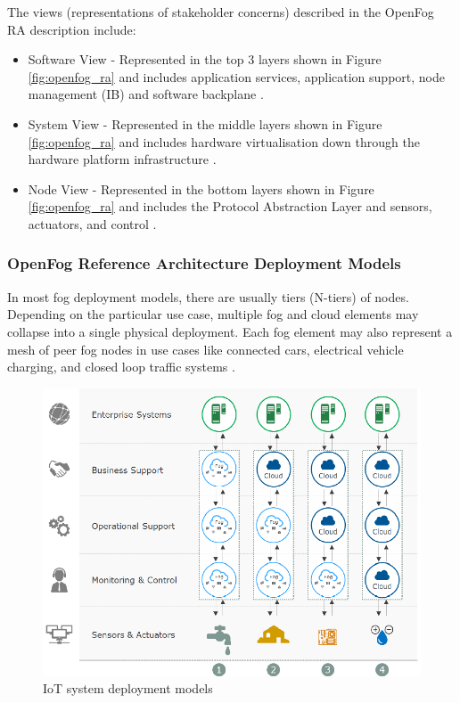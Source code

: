 \documentclass{article}
\begin{document}
The views (representations of stakeholder concerns) \cite{openfogconsortium2017} described in the OpenFog RA description include:

\begin{itemize}
\item Software View - Represented in the top 3 layers shown in Figure \ref{fig:openfog_ra} and includes application services, application support, node management (IB) and software backplane \cite{openfogconsortium2017}.

\item System View - Represented in the middle layers shown in Figure \ref{fig:openfog_ra} and includes hardware virtualisation down through the hardware platform infrastructure \cite{openfogconsortium2017}.

\item Node View - Represented in the bottom layers shown in Figure \ref{fig:openfog_ra} and includes the Protocol Abstraction Layer and sensors, actuators, and control \cite{openfogconsortium2017}.
\end{itemize} 

\subsubsection{OpenFog Reference Architecture Deployment Models} 

In most fog deployment models, there are usually tiers (N-tiers) of nodes. Depending on the particular use case, multiple fog and cloud elements may collapse into a single physical deployment. Each fog element may also represent a mesh of peer fog nodes in use cases like connected cars, electrical vehicle charging, and closed loop traffic systems \cite{openfogconsortium2017}.

\begin{figure}[H]
	\centering
	\includegraphics[scale=0.5]{models.png}
	\caption{IoT system deployment models \cite{openfogconsortium2017}}
	\label{fig:depl_models}
\end{figure}
\end{document}
